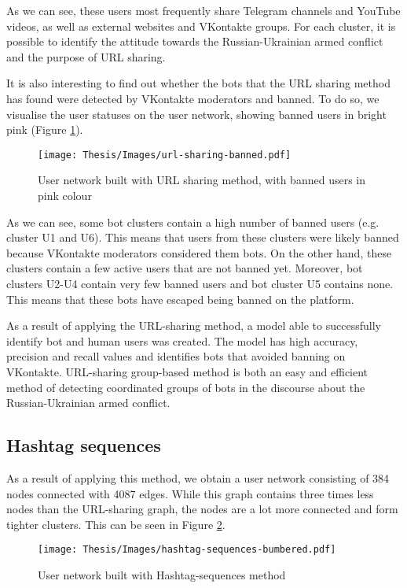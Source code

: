 As we can see, these users most frequently share Telegram channels and YouTube videos, as well as external websites and VKontakte groups. For each cluster, it is possible to identify the attitude towards the Russian-Ukrainian armed conflict and the purpose of URL sharing. 

It is also interesting to find out whether the bots that the URL sharing method has found were detected by VKontakte moderators and banned. To do so, we visualise the user statuses on the user network, showing banned users in bright pink (Figure \ref{fig:url-sharing-banned}). 

\begin{figure}
	\centering
	\texttt{[image: Thesis/Images/url-sharing-banned.pdf]}
	\caption{User network built with URL sharing  method, with banned users in pink colour}
	\label{fig:url-sharing-banned}
\end{figure}

As we can see, some bot clusters contain a high number of banned users (e.g. cluster U1 and U6). This means that users from these clusters were likely banned because VKontakte moderators considered them bots. On the other hand, these clusters contain a few active users that are not banned yet. Moreover, bot clusters U2-U4 contain very few banned users and bot cluster U5 contains none. This means that these bots have escaped being banned on the platform. 

As a result of applying the URL-sharing method, a model able to successfully identify bot and human users was created. The model has high accuracy, precision and recall values and identifies bots that avoided banning on VKontakte. URL-sharing group-based method is both an easy and efficient method of detecting coordinated groups of bots in the discourse about the Russian-Ukrainian armed conflict.


\subsection{Hashtag sequences}
As a result of applying this method, we obtain a user network consisting of 384 nodes connected with 4087 edges. While this graph contains three times less nodes than the URL-sharing graph, the nodes are a lot more connected and form tighter clusters. This can be seen in Figure \ref{fig:hashtag-sequences}.

\begin{figure}
	\centering
	\texttt{[image: Thesis/Images/hashtag-sequences-bumbered.pdf]}
	\caption{User network built with Hashtag-sequences method}
	\label{fig:hashtag-sequences}
\end{figure}

